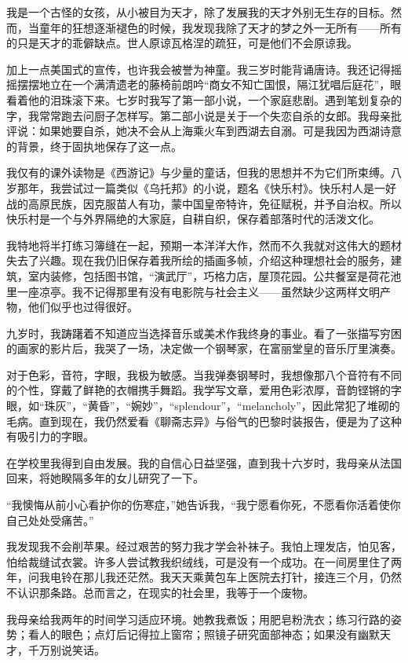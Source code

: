 \par 我是一个古怪的女孩，从小被目为天才，除了发展我的天才外别无生存的目标。然而，当童年的狂想逐渐褪色的时候，我发现我除了天才的梦之外一无所有——所有的只是天才的乖僻缺点。世人原谅瓦格涅的疏狂，可是他们不会原谅我。
\par 加上一点美国式的宣传，也许我会被誉为神童。我三岁时能背诵唐诗。我还记得摇摇摆摆地立在一个满清遗老的藤椅前朗吟“商女不知亡国恨，隔江犹唱后庭花”，眼看着他的泪珠滚下来。七岁时我写了第一部小说，一个家庭悲剧。遇到笔划复杂的字，我常常跑去问厨子怎样写。第二部小说是关于一个失恋自杀的女郎。我母亲批评说：如果她要自杀，她决不会从上海乘火车到西湖去自溺。可是我因为西湖诗意的背景，终于固执地保存了这一点。
\par 我仅有的课外读物是《西游记》与少量的童话，但我的思想并不为它们所束缚。八岁那年，我尝试过一篇类似《乌托邦》的小说，题名《快乐村》。快乐村人是一好战的高原民族，因克服苗人有功，蒙中国皇帝特许，免征赋税，并予自治权。所以快乐村是一个与外界隔绝的大家庭，自耕自织，保存着部落时代的活泼文化。
\par 我特地将半打练习簿缝在一起，预期一本洋洋大作，然而不久我就对这伟大的题材失去了兴趣。现在我仍旧保存着我所绘的插画多帧，介绍这种理想社会的服务，建筑，室内装修，包括图书馆，“演武厅”，巧格力店，屋顶花园。公共餐室是荷花池里一座凉亭。我不记得那里有没有电影院与社会主义——虽然缺少这两样文明产物，他们似乎也过得很好。
\par 九岁时，我踌躇着不知道应当选择音乐或美术作我终身的事业。看了一张描写穷困的画家的影片后，我哭了一场，决定做一个钢琴家，在富丽堂皇的音乐厅里演奏。
\par 对于色彩，音符，字眼，我极为敏感。当我弹奏钢琴时，我想像那八个音符有不同的个性，穿戴了鲜艳的衣帽携手舞蹈。我学写文章，爱用色彩浓厚，音韵铿锵的字眼，如“珠灰”，“黄昏”，“婉妙”，“splendour”，“melancholy”，因此常犯了堆砌的毛病。直到现在，我仍然爱看《聊斋志异》与俗气的巴黎时装报告，便是为了这种有吸引力的字眼。
\par 在学校里我得到自由发展。我的自信心日益坚强，直到我十六岁时，我母亲从法国回来，将她睽隔多年的女儿研究了一下。
\par “我懊悔从前小心看护你的伤寒症，”她告诉我，“我宁愿看你死，不愿看你活着使你自己处处受痛苦。”
\par 我发现我不会削苹果。经过艰苦的努力我才学会补袜子。我怕上理发店，怕见客，怕给裁缝试衣裳。许多人尝试教我织绒线，可是没有一个成功。在一间房里住了两年，问我电铃在那儿我还茫然。我天天乘黄包车上医院去打针，接连三个月，仍然不认识那条路。总而言之，在现实的社会里，我等于一个废物。
\par 我母亲给我两年的时间学习适应环境。她教我煮饭；用肥皂粉洗衣；练习行路的姿势；看人的眼色；点灯后记得拉上窗帘；照镜子研究面部神态；如果没有幽默天才，千万别说笑话。

